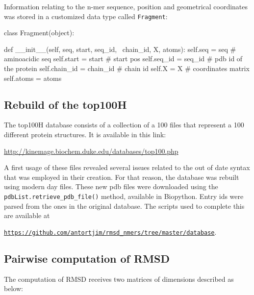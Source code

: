 \documentclass[a4paper, 11pt]{article} %
\begin{document}
Information relating to the n-mer sequence, position and geometrical coordinates was stored in a customized data type called \texttt{Fragment}:


\lstset{language=Python}          %

\begin{python}
class Fragment(object):

    def __init__(self, seq, start, seq_id, \
    chain_id, X, atoms):
        self.seq = seq           # aminoacidic seq
        self.start = start       # start pos
        self.seq_id = seq_id     # pdb id of the protein
        self.chain_id = chain_id # chain id
        self.X = X               # coordinates matrix
        self.atoms = atoms
\end{python}





\subsection{Rebuild of the top100H}

The top100H database consists of a collection of a 100 files that represent a 100 different protein structures. It is available in this link:

\color{blue}
\href{http://kinemage.biochem.duke.edu/databases/top100.php}{http://kinemage.biochem.duke.edu/databases/top100.php}
\color{black}

A first usage of these files revealed several issues related to the out of date syntax that was employed in their creation. For that reason, the database was rebuilt using modern day files.
These new pdb files were downloaded using the \texttt{pdbList.retrieve\_pdb\_file()} method, available in Biopython. Entry ids were parsed from the ones in the original database. The scripts used to complete this are available at

\texttt{\href{https://github.com/antortjim/rmsd\_nmers/tree/master/database}{https://github.com/antortjim/rmsd\_nmers/tree/master/database}}.


\subsection{Pairwise computation of RMSD}

The computation of RMSD receives two matrices of dimensions described as below:
\end{document}
